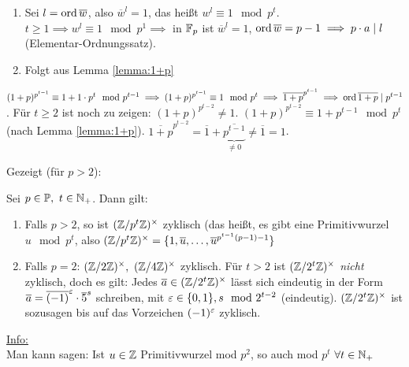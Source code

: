 \documentclass[a4paper,twoside,DIV15,BCOR12mm]{scrbook}
\begin{document}
\begin{beweis}
\begin{enumerate}
    \item Sei $l=\mathop{\rm ord}\nolimits \overline w$, also $\overline w^l=1$, das
    heißt $w^l\equiv 1 \mod p^t$. $t\geq 1 \implies w^l \equiv 1
    \mod p^1 \implies $ in $\mathbb{F}_p$ ist $\overline w^l=1$, $\mathop{\rm ord}\nolimits
    \overline w=p-1 \implies p\cdot a \mid l$ (Elementar-Ordnungssatz).
    \item Folgt aus Lemma \ref{lemma:1+p}
\end{enumerate}

$(1+p)^{p^{t-1}}\equiv1+1\cdot p^t \mod p^{t-1} \implies
(1+p)^{p^{t-1}}\equiv 1 \mod p^t \implies \overline{1+p}^{p^{t-1}}
\implies \mathop{\rm ord}\nolimits \overline{1+p} \mid p^{t-1}$. Für $t \geq 2$ ist noch
zu zeigen: $(1+p)^{p^{t-2}} \neq 1$. $(1+p)^{p^{t-2}} \equiv 1+
p^{t-1} \mod p^t$ (nach Lemma \ref{lemma:1+p}).
$\overline{1+p}^{p^{t-2}}=\overline 1 +
\underbrace{\overline{p^{t-1}}}_{\neq 0} \neq \overline 1 =1$.
\end{beweis}

Gezeigt (für $p>2$):
\begin{satz}
Sei $p\in\mathbb{P},\ t\in \mathbb{N}_+$. Dann gilt:
\begin{enumerate}
    \item Falls $p>2$, so ist $(\mathbb{Z}/p^t \mathbb{Z})^{\times}$ zyklisch
    (das heißt, es gibt eine Primitivwurzel $u \mod p^t$, also $(\mathbb{Z}/p^t
    \mathbb{Z})^{\times}=\{ 1,\overline u,\dotsc, \overline
    u^{p^{t-1}(p-1)-1}\}$
    \item Falls $p=2$: $(\mathbb{Z}/2 \mathbb{Z})^{\times},\ (\mathbb{Z}/4
    \mathbb{Z})^{\times}$ zyklisch. Für $t>2$ ist $(\mathbb{Z}/2^t
    \mathbb{Z})^{\times}$ \emph{nicht} zyklisch, doch es gilt: Jedes
    $\overline a \in (\mathbb{Z}/2^t \mathbb{Z})^{\times}$ lässt sich eindeutig
    in der Form $\overline a=\overline{(-1)}^{\varepsilon} \cdot \overline 5
    ^s$ schreiben, mit $\varepsilon \in \{0,1\}, s \mod 2^{t-2}$
    (eindeutig). $(\mathbb{Z}/2^t \mathbb{Z})^{\times}$ ist sozusagen bis auf
    das Vorzeichen $(-1)^{\varepsilon}$ zyklisch.
\end{enumerate}
\end{satz}


\underline{Info:}\\
Man kann sagen: Ist $u \in \mathbb{Z}$  Primitivwurzel mod $p^2$, so auch mod $p^t$ $\forall t \in \mathbb{N}_+$
\\
\end{document}
